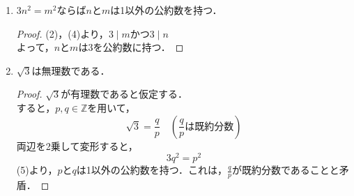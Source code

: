 \documentclass[a4paper,12pt]{ltjsarticle}
\newcommand{\Z}{\mathbb{Z}}
\begin{document}
\begin{enumerate}[(1)]
\begin{proof}
            したがって，$3 \mid n^2$すなわち$3 \mid n$
        \end{proof}
    \item $3n^2 = m^2$ならば$n$と$m$は1以外の公約数を持つ．
        \begin{proof}
            (2)，(4)より，$3 \mid m$かつ$3 \mid n$ \\
            よって，$n$と$m$は3を公約数に持つ．
        \end{proof}
    \item $\sqrt{3}$は無理数である．
        \begin{proof}
            $\sqrt{3}$が有理数であると仮定する． \\
            すると，$p,q \in \Z$を用いて，
            \begin{equation*}
                \sqrt{3} = \frac{q}{p} \quad (\frac{q}{p}は既約分数)
            \end{equation*}
            両辺を2乗して変形すると，
            \begin{equation*}
                3q^2 = p^2
            \end{equation*}
            (5)より，$p$と$q$は1以外の公約数を持つ．これは，$\frac{q}{p}$が既約分数であることと矛盾．
        \end{proof}
\end{enumerate}
\end{document}

